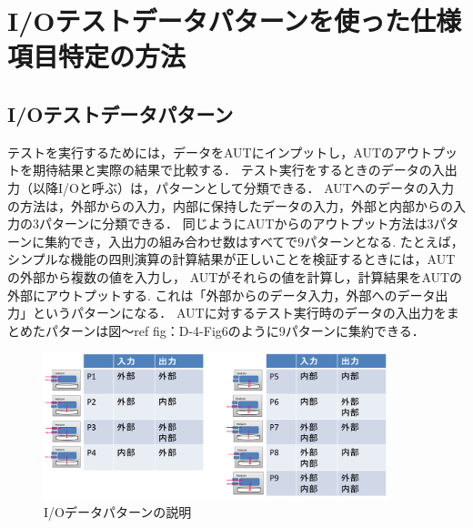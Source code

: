 \documentclass[a4paper,12pt]{jreport}
\begin{document}
\section{I/Oテストデータパターンを使った仕様項目特定の方法}

\subsection{I/Oテストデータパターン}

テストを実行するためには，データをAUTにインプットし，AUTのアウトプットを期待結果と実際の結果で比較する．
テスト実行をするときのデータの入出力（以降I/Oと呼ぶ）は，パターンとして分類できる．
AUTへのデータの入力の方法は，外部からの入力，内部に保持したデータの入力，外部と内部からの入力の3パターンに分類できる．
同じようにAUTからのアウトプット方法は3パターンに集約でき，入出力の組み合わせ数はすべてで9パターンとなる.
たとえば，シンプルな機能の四則演算の計算結果が正しいことを検証するときには，AUTの外部から複数の値を入力し， AUTがそれらの値を計算し，計算結果をAUTの外部にアウトプットする.
これは「外部からのデータ入力，外部へのデータ出力」というパターンになる．
AUTに対するテスト実行時のデータの入出力をまとめたパターンは図〜ref {fig：D-4-Fig6}のように9パターンに集約できる．
   \begin{figure}[htbp]
 \begin{center}
 \includegraphics[width=10cm]{./image/D-3-Fig5.png}
 \caption{I/Oデータパターンの説明}
 \label{fig:D-4-Fig6}
 \end{center}
  \end{figure}
\end{document}
